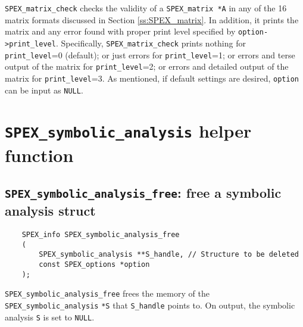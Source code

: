 \documentclass[12pt]{report}
\theoremstyle{definition}
\begin{document}
\verb|SPEX_matrix_check| checks the validity of a \verb|SPEX_matrix *A| in any
of the 16 matrix formats discussed in Section \ref{ss:SPEX_matrix}.
In addition, it prints the matrix and any error found with proper print level specified by
\verb|option->print_level|. Specifically, \verb|SPEX_matrix_check| prints nothing for \verb|print_level|=0 (default); or just errors for \verb|print_level|=1; or errors and terse output of the matrix for \verb|print_level|=2; or errors and detailed output of the matrix for \verb|print_level|=3.
As mentioned, if default settings are desired, \verb|option| can be input as \verb|NULL|. 


\section{\texttt{SPEX\_symbolic\_analysis} helper function} \label{s:spex_symbolic_analysis_helper}

\subsection{\texttt{SPEX\_symbolic\_analysis\_free}: free a symbolic analysis struct}
\begin{mdframed}[userdefinedwidth=6in]
{\footnotesize
\begin{verbatim}
    SPEX_info SPEX_symbolic_analysis_free
    (
        SPEX_symbolic_analysis **S_handle, // Structure to be deleted
        const SPEX_options *option
    ); 
\end{verbatim}
} \end{mdframed}

\verb|SPEX_symbolic_analysis_free| frees the memory of the \verb|SPEX_symbolic_analysis| \verb|*S| that \verb|S_handle| points to. On output, the symbolic analysis \verb|S| is set to \verb|NULL|.
\end{document}
